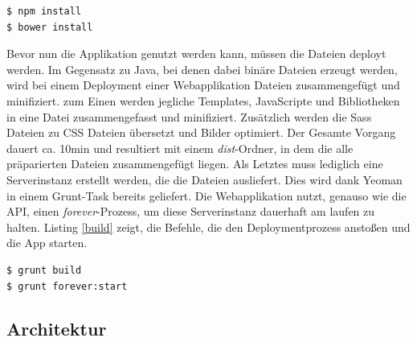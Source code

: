 \vspace{1cm}
\begin{lstlisting}[caption=Installation der Zusatzbibliotheken für die Webapplikation,label=installDependencies]
$ npm install
$ bower install
\end{lstlisting}
\vspace{0.5cm}

Bevor nun die Applikation genutzt werden kann, müssen die Dateien deployt werden. Im Gegensatz zu Java, bei denen dabei binäre Dateien erzeugt werden, wird bei einem Deployment einer Webapplikation Dateien zusammengefügt und minifiziert. zum Einen werden jegliche Templates, JavaScripte und Bibliotheken in eine Datei zusammengefasst und minifiziert. Zusätzlich werden die Sass Dateien zu CSS Dateien übersetzt und Bilder optimiert. Der Gesamte Vorgang dauert ca. 10min und resultiert mit einem \textit{dist}-Ordner, in dem die alle präparierten Dateien zusammengefügt liegen. Als Letztes muss lediglich eine Serverinstanz erstellt werden, die die Dateien ausliefert. Dies wird dank Yeoman in einem Grunt-Task bereits geliefert. Die Webapplikation nutzt, genauso wie die API, einen \textit{forever}-Prozess, um diese Serverinstanz dauerhaft am laufen zu halten. Listing \ref{build} zeigt, die Befehle, die den Deploymentprozess anstoßen und die App starten.

\vspace{1cm}
\begin{lstlisting}[caption=Deployment und Start der Webapplikation,label=build]
$ grunt build
$ grunt forever:start
\end{lstlisting}
\vspace{0.5cm}


\subsection{Architektur}

